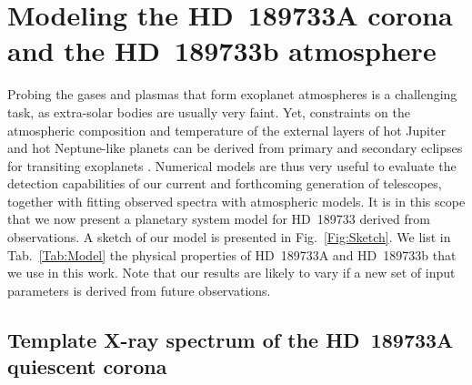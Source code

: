 \documentclass[iop]{emulateapj}
\begin{document}
\section[Modeling the HD~189733A corona and the HD~189733b atmosphere]{Modeling the HD~189733A corona and the HD~189733\MakeLowercase{b} atmosphere}
\label{Model}

Probing the gases and plasmas that form exoplanet atmospheres is a challenging task, as extra-solar bodies are usually very faint. 
Yet, constraints on the atmospheric composition and temperature of the external layers of hot Jupiter and hot Neptune-like planets can be 
derived from primary and secondary eclipses for transiting exoplanets \citep{Seager2000}. Numerical models are thus very useful to evaluate 
the detection capabilities of our current and forthcoming generation of telescopes, together with fitting observed spectra with atmospheric 
models. It is in this scope that we now present a planetary system model for HD~189733 derived from observations. A sketch of our model is 
presented in Fig.~\ref{Fig:Sketch}. We list in Tab.~\ref{Tab:Model} the physical properties of HD~189733A and HD~189733b that we use in this 
work. Note that our results are likely to vary if a new set of input parameters is derived from future observations. 

\subsection{Template X-ray spectrum of the HD~189733A quiescent corona}
\label{Model:Corona}
\end{document}
